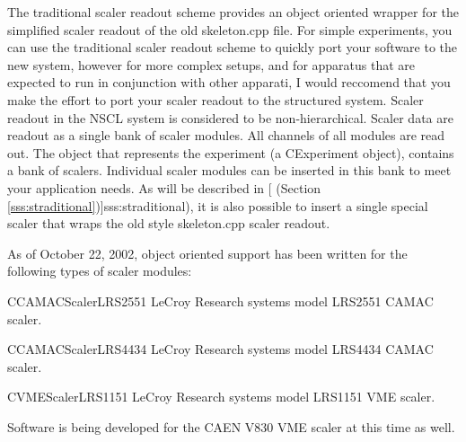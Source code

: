       The traditional scaler readout scheme provides an object oriented 
      wrapper for the simplified scaler readout of the old skeleton.cpp
      file.  For simple experiments, you can use the traditional 
      scaler readout scheme to quickly port your software to the new
      system, however for more complex setups, and for apparatus that are
      expected to run in conjunction with other apparati, I would reccomend 
      that you make the effort to port your scaler readout to the structured
      system.
	 Scaler readout in the  NSCL system is considered to be
	 non-hierarchical.  Scaler data are readout as a single
	 bank of scaler modules.  All channels of all modules
	 are read out.  The object that represents the
	 experiment (a CExperiment object), contains a
	 bank of scalers.  Individual scaler modules can be
	 inserted in this bank to meet your application needs.
	 As will be described in 
	 [ 
	 (Section \ref{sss:straditional})]{sss:straditional}), it is also
	 possible to insert a single special scaler that wraps the
	 old style skeleton.cpp scaler readout.
	 
	 As of October 22, 2002, object oriented support has been 
	 written for the following types of scaler modules:
	 \begin{description}
	    \item{CCAMACScalerLRS2551} LeCroy Research systems model LRS2551 CAMAC scaler.
	    \item{CCAMACScalerLRS4434} LeCroy Research systems model LRS4434 CAMAC scaler.
	    \item{CVMEScalerLRS1151}   LeCroy Research systems model LRS1151 VME scaler.
	 \end{description}
	 Software is being developed for the CAEN V830 VME scaler at this time as well.
	 
